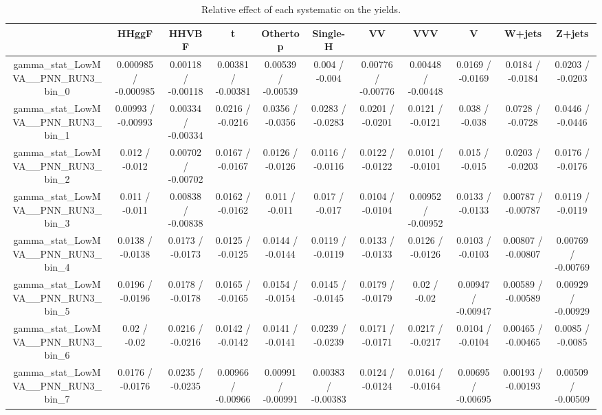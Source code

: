 \documentclass[10pt]{article}
\begin{document}
\begin{table}[htbp]
\begin{center}
\begin{tabular}{|c|c|c|c|c|c|c|c|c|c|c|}
\hline 
      & HHggF      & HHVBF      & t      & Othertop      & Single-H      & VV      & VVV      & V      & W+jets      & Z+jets \\ 
\hline 
  gamma_stat_LowMVA__PNN_RUN3_bin_0 & 0.000985 / -0.000985 & 0.00118 / -0.00118 & 0.00381 / -0.00381 & 0.00539 / -0.00539 & 0.004 / -0.004 & 0.00776 / -0.00776 & 0.00448 / -0.00448 & 0.0169 / -0.0169 & 0.0184 / -0.0184 & 0.0203 / -0.0203 \\ 
  gamma_stat_LowMVA__PNN_RUN3_bin_1 & 0.00993 / -0.00993 & 0.00334 / -0.00334 & 0.0216 / -0.0216 & 0.0356 / -0.0356 & 0.0283 / -0.0283 & 0.0201 / -0.0201 & 0.0121 / -0.0121 & 0.038 / -0.038 & 0.0728 / -0.0728 & 0.0446 / -0.0446 \\ 
  gamma_stat_LowMVA__PNN_RUN3_bin_2 & 0.012 / -0.012 & 0.00702 / -0.00702 & 0.0167 / -0.0167 & 0.0126 / -0.0126 & 0.0116 / -0.0116 & 0.0122 / -0.0122 & 0.0101 / -0.0101 & 0.015 / -0.015 & 0.0203 / -0.0203 & 0.0176 / -0.0176 \\ 
  gamma_stat_LowMVA__PNN_RUN3_bin_3 & 0.011 / -0.011 & 0.00838 / -0.00838 & 0.0162 / -0.0162 & 0.011 / -0.011 & 0.017 / -0.017 & 0.0104 / -0.0104 & 0.00952 / -0.00952 & 0.0133 / -0.0133 & 0.00787 / -0.00787 & 0.0119 / -0.0119 \\ 
  gamma_stat_LowMVA__PNN_RUN3_bin_4 & 0.0138 / -0.0138 & 0.0173 / -0.0173 & 0.0125 / -0.0125 & 0.0144 / -0.0144 & 0.0119 / -0.0119 & 0.0133 / -0.0133 & 0.0126 / -0.0126 & 0.0103 / -0.0103 & 0.00807 / -0.00807 & 0.00769 / -0.00769 \\ 
  gamma_stat_LowMVA__PNN_RUN3_bin_5 & 0.0196 / -0.0196 & 0.0178 / -0.0178 & 0.0165 / -0.0165 & 0.0154 / -0.0154 & 0.0145 / -0.0145 & 0.0179 / -0.0179 & 0.02 / -0.02 & 0.00947 / -0.00947 & 0.00589 / -0.00589 & 0.00929 / -0.00929 \\ 
  gamma_stat_LowMVA__PNN_RUN3_bin_6 & 0.02 / -0.02 & 0.0216 / -0.0216 & 0.0142 / -0.0142 & 0.0141 / -0.0141 & 0.0239 / -0.0239 & 0.0171 / -0.0171 & 0.0217 / -0.0217 & 0.0104 / -0.0104 & 0.00465 / -0.00465 & 0.0085 / -0.0085 \\ 
  gamma_stat_LowMVA__PNN_RUN3_bin_7 & 0.0176 / -0.0176 & 0.0235 / -0.0235 & 0.00966 / -0.00966 & 0.00991 / -0.00991 & 0.00383 / -0.00383 & 0.0124 / -0.0124 & 0.0164 / -0.0164 & 0.00695 / -0.00695 & 0.00193 / -0.00193 & 0.00509 / -0.00509 \\ 
\hline 
\end{tabular} 
\caption{Relative effect of each systematic on the yields.} 
\end{center} 
\end{table} 
\end{document}
